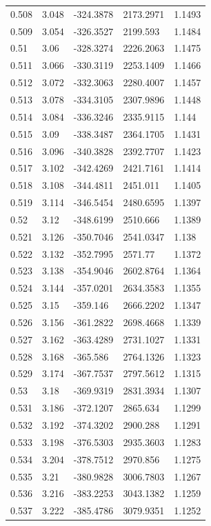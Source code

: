 \begin{tabular}{lllll}
0.508 & 3.048 & -324.3878 & 2173.2971 & 1.1493 \\
0.509 & 3.054 & -326.3527 & 2199.593 & 1.1484 \\
0.51 & 3.06 & -328.3274 & 2226.2063 & 1.1475 \\
0.511 & 3.066 & -330.3119 & 2253.1409 & 1.1466 \\
0.512 & 3.072 & -332.3063 & 2280.4007 & 1.1457 \\
0.513 & 3.078 & -334.3105 & 2307.9896 & 1.1448 \\
0.514 & 3.084 & -336.3246 & 2335.9115 & 1.144 \\
0.515 & 3.09 & -338.3487 & 2364.1705 & 1.1431 \\
0.516 & 3.096 & -340.3828 & 2392.7707 & 1.1423 \\
0.517 & 3.102 & -342.4269 & 2421.7161 & 1.1414 \\
0.518 & 3.108 & -344.4811 & 2451.011 & 1.1405 \\
0.519 & 3.114 & -346.5454 & 2480.6595 & 1.1397 \\
0.52 & 3.12 & -348.6199 & 2510.666 & 1.1389 \\
0.521 & 3.126 & -350.7046 & 2541.0347 & 1.138 \\
0.522 & 3.132 & -352.7995 & 2571.77 & 1.1372 \\
0.523 & 3.138 & -354.9046 & 2602.8764 & 1.1364 \\
0.524 & 3.144 & -357.0201 & 2634.3583 & 1.1355 \\
0.525 & 3.15 & -359.146 & 2666.2202 & 1.1347 \\
0.526 & 3.156 & -361.2822 & 2698.4668 & 1.1339 \\
0.527 & 3.162 & -363.4289 & 2731.1027 & 1.1331 \\
0.528 & 3.168 & -365.586 & 2764.1326 & 1.1323 \\
0.529 & 3.174 & -367.7537 & 2797.5612 & 1.1315 \\
0.53 & 3.18 & -369.9319 & 2831.3934 & 1.1307 \\
0.531 & 3.186 & -372.1207 & 2865.634 & 1.1299 \\
0.532 & 3.192 & -374.3202 & 2900.288 & 1.1291 \\
0.533 & 3.198 & -376.5303 & 2935.3603 & 1.1283 \\
0.534 & 3.204 & -378.7512 & 2970.856 & 1.1275 \\
0.535 & 3.21 & -380.9828 & 3006.7803 & 1.1267 \\
0.536 & 3.216 & -383.2253 & 3043.1382 & 1.1259 \\
0.537 & 3.222 & -385.4786 & 3079.9351 & 1.1252 \\

\end{tabular}
